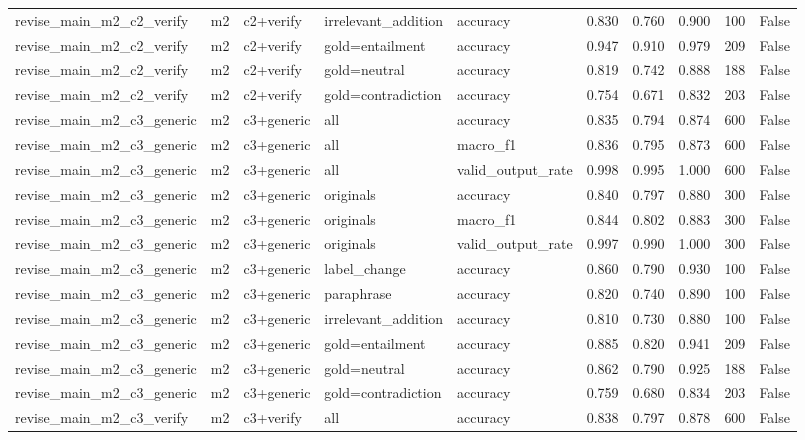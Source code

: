 \begin{tabular}{llllllllll}
revise\_main\_m2\_c2\_verify & m2 & c2+verify & irrelevant\_addition & accuracy & 0.830 & 0.760 & 0.900 & 100 & False \\
revise\_main\_m2\_c2\_verify & m2 & c2+verify & gold=entailment & accuracy & 0.947 & 0.910 & 0.979 & 209 & False \\
revise\_main\_m2\_c2\_verify & m2 & c2+verify & gold=neutral & accuracy & 0.819 & 0.742 & 0.888 & 188 & False \\
revise\_main\_m2\_c2\_verify & m2 & c2+verify & gold=contradiction & accuracy & 0.754 & 0.671 & 0.832 & 203 & False \\
revise\_main\_m2\_c3\_generic & m2 & c3+generic & all & accuracy & 0.835 & 0.794 & 0.874 & 600 & False \\
revise\_main\_m2\_c3\_generic & m2 & c3+generic & all & macro\_f1 & 0.836 & 0.795 & 0.873 & 600 & False \\
revise\_main\_m2\_c3\_generic & m2 & c3+generic & all & valid\_output\_rate & 0.998 & 0.995 & 1.000 & 600 & False \\
revise\_main\_m2\_c3\_generic & m2 & c3+generic & originals & accuracy & 0.840 & 0.797 & 0.880 & 300 & False \\
revise\_main\_m2\_c3\_generic & m2 & c3+generic & originals & macro\_f1 & 0.844 & 0.802 & 0.883 & 300 & False \\
revise\_main\_m2\_c3\_generic & m2 & c3+generic & originals & valid\_output\_rate & 0.997 & 0.990 & 1.000 & 300 & False \\
revise\_main\_m2\_c3\_generic & m2 & c3+generic & label\_change & accuracy & 0.860 & 0.790 & 0.930 & 100 & False \\
revise\_main\_m2\_c3\_generic & m2 & c3+generic & paraphrase & accuracy & 0.820 & 0.740 & 0.890 & 100 & False \\
revise\_main\_m2\_c3\_generic & m2 & c3+generic & irrelevant\_addition & accuracy & 0.810 & 0.730 & 0.880 & 100 & False \\
revise\_main\_m2\_c3\_generic & m2 & c3+generic & gold=entailment & accuracy & 0.885 & 0.820 & 0.941 & 209 & False \\
revise\_main\_m2\_c3\_generic & m2 & c3+generic & gold=neutral & accuracy & 0.862 & 0.790 & 0.925 & 188 & False \\
revise\_main\_m2\_c3\_generic & m2 & c3+generic & gold=contradiction & accuracy & 0.759 & 0.680 & 0.834 & 203 & False \\
revise\_main\_m2\_c3\_verify & m2 & c3+verify & all & accuracy & 0.838 & 0.797 & 0.878 & 600 & False \\

\end{tabular}
